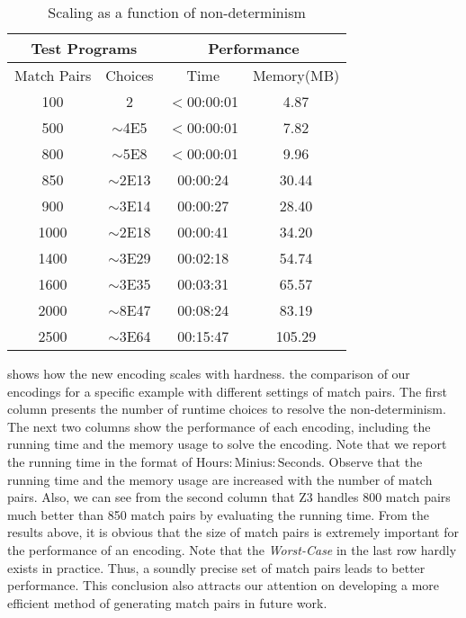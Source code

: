 \begin{table}
\begin{center}
\scriptsize
\caption{Scaling as a function of non-determinism}
\begin{tabular}{|c|c|c|c|}
		\hline
         \multicolumn{2}{|c|}{Test Programs} & \multicolumn{2}{|c|}{Performance} \\ \hline
          Match Pairs & Choices &  Time & Memory(MB) \\ \hline
      100   &  2 & $<$00:00:01 & 4.87 \\
      500   &  $\sim$4E5 &  $<$00:00:01 & 7.82 \\
      800   &  $\sim$5E8 &  $<$00:00:01 & 9.96 \\
      850   &  $\sim$2E13 &  00:00:24 & 30.44 \\
      900   &  $\sim$3E14 &  00:00:27 & 28.40 \\
      1000   &   $\sim$2E18 &  00:00:41 & 34.20 \\
      1400   & $\sim$3E29 &  00:02:18 & 54.74 \\
      1600   & $\sim$3E35 &  00:03:31 & 65.57 \\
      2000   & $\sim$8E47 &  00:08:24 & 83.19 \\ 
      2500   & $\sim$3E64 &  00:15:47 & 105.29 \\ 
         \hline
		\end{tabular}
\end{center}
\label{table:first}
\end{table}

 shows how the new encoding scales with hardness. the comparison of our encodings for a specific example with different settings of match pairs. The first column presents the number of runtime choices to resolve the non-determinism. The next two columns show the performance of each encoding, including the running time and the memory usage to solve the encoding. Note that we report the running time in the format of $\mathrm{Hours:Minius:Seconds}$. Observe that the running time and the memory usage are increased with the number of match pairs. Also, we can see from the second column that Z3 handles 800 match pairs much better than 850 match pairs by evaluating the running time. From the results above, it is obvious that the size of match pairs is extremely important for the performance of an encoding. Note that the \textit{Worst-Case} in the last row hardly exists in practice. Thus, a soundly precise set of match pairs leads to better performance. This conclusion also attracts our attention on developing a more efficient method of generating match pairs in future work.


